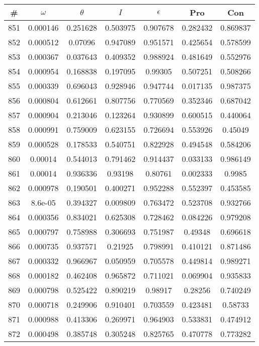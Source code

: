 \newpage
\begin{table}
\begin{tabular}{c|c|c|c|c|c|c}
\# & $\omega$ & $\theta$ & $I$ & $\epsilon$ & Pro & Con\\
\hline
851 & 0.000146 & 0.251628 & 0.503975 & 0.907678 & 0.282432 & 0.869837\\
852 & 0.000512 & 0.07096 & 0.947089 & 0.951571 & 0.425654 & 0.578599\\
853 & 0.000367 & 0.037643 & 0.409352 & 0.988924 & 0.481649 & 0.552976\\
854 & 0.000954 & 0.168838 & 0.197095 & 0.99305 & 0.507251 & 0.508266\\
855 & 0.000339 & 0.696043 & 0.928946 & 0.947744 & 0.017135 & 0.987375\\
856 & 0.000804 & 0.612661 & 0.807756 & 0.770569 & 0.352346 & 0.687042\\
857 & 0.000904 & 0.213046 & 0.123264 & 0.930899 & 0.600515 & 0.440064\\
858 & 0.000991 & 0.759009 & 0.623155 & 0.726694 & 0.553926 & 0.45049\\
859 & 0.000528 & 0.178533 & 0.540751 & 0.822928 & 0.494548 & 0.584206\\
860 & 0.00014 & 0.544013 & 0.791462 & 0.914437 & 0.033133 & 0.986149\\
861 & 0.00014 & 0.936336 & 0.93198 & 0.80761 & 0.002333 & 0.9985\\
862 & 0.000978 & 0.190501 & 0.400271 & 0.952288 & 0.552397 & 0.453585\\
863 & 8.6e-05 & 0.394327 & 0.009809 & 0.763472 & 0.523708 & 0.932766\\
864 & 0.000356 & 0.834021 & 0.625308 & 0.728462 & 0.084226 & 0.979208\\
865 & 0.000797 & 0.758988 & 0.306693 & 0.751987 & 0.49348 & 0.696618\\
866 & 0.000735 & 0.937571 & 0.21925 & 0.798991 & 0.410121 & 0.871486\\
867 & 0.000332 & 0.966967 & 0.050959 & 0.705578 & 0.449814 & 0.989271\\
868 & 0.000182 & 0.462408 & 0.965872 & 0.711021 & 0.069904 & 0.935833\\
869 & 0.000798 & 0.525422 & 0.890219 & 0.98917 & 0.28256 & 0.740249\\
870 & 0.000718 & 0.249906 & 0.910401 & 0.703559 & 0.423481 & 0.58733\\
871 & 0.000988 & 0.413306 & 0.269971 & 0.964903 & 0.533831 & 0.474912\\
872 & 0.000498 & 0.385748 & 0.305248 & 0.825765 & 0.470778 & 0.773282\\

\end{tabular}
\end{table}
